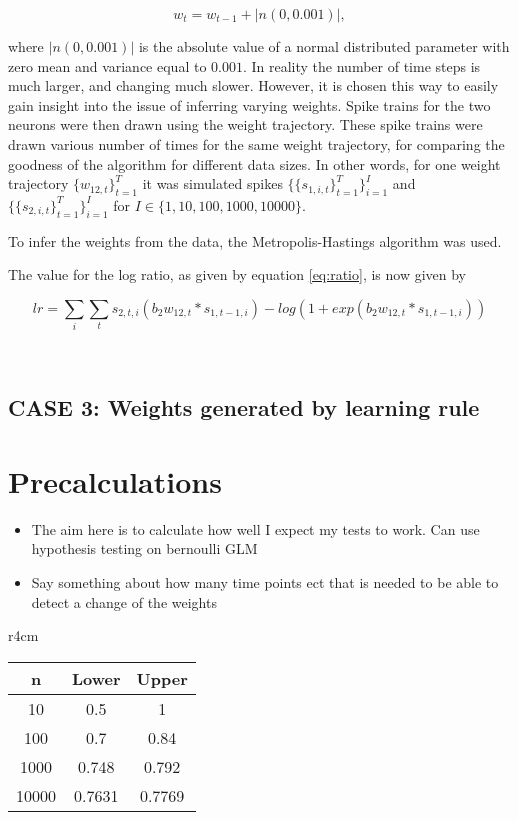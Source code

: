 \begin{equation}
    w_{t} = w_{t-1} + |n(0,0.001)|,
\end{equation}

where $|n(0,0.001)|$ is the absolute value of a normal distributed parameter with zero mean and variance equal to $0.001$. In reality the number of time steps is much larger, and changing much slower. However, it is chosen this way to easily gain insight into the issue of inferring varying weights. Spike trains for the two neurons were then drawn using the weight trajectory. These spike trains were drawn various number of times for the same weight trajectory, for comparing the goodness of the algorithm for different data sizes. In other words, for one weight trajectory $\{w_{12,t}\}_{t=1}^T$ it was simulated spikes
$\{\{s_{1,i,t}\}_{t=1}^T\}_{i=1}^I$ and $\{\{s_{2,i,t}\}_{t=1}^T\}_{i=1}^I$ for $I \in \{1,10,100,1000,10000 \}$.

To infer the weights from the data, the Metropolis-Hastings algorithm was used.

The value for the log ratio, as given by equation \ref{eq:ratio}, is now given by

\begin{equation}
    lr = \sum_i \sum_t s_{2,t,i}(b_2 w_{12,t}*s_{1,t-1,i}) - log(1 + exp(b_2 w_{12,t} * s_{1,t-1,i}))
\end{equation}


\\

\subsection{CASE 3: Weights generated by learning rule}


\section{Precalculations}
\label{Precalc}

\begin{itemize}
    \item The aim here is to calculate how well I expect my tests to work. Can use hypothesis testing on bernoulli GLM 
    \item Say something about how many time points ect that is needed to be able to detect a change of the weights
\end{itemize}

\begin{wraptable}{r}{4cm}
\begin{center}
 \begin{tabular}{||c c c ||} 
 \hline
 n & Lower & Upper \\ [0.5ex] 
 \hline\hline
 10 & 0.5 & 1 \\ 
 \hline
 100 & 0.7 & 0.84 \\
 \hline
 1000 & 0.748 & 0.792 \\
 \hline
 10000 & 0.7631 & 0.7769 \\ [1ex] 
 \hline
\end{tabular}
\end{center}
\end{wraptable}

